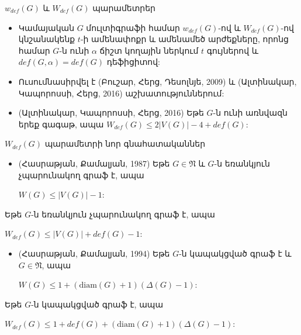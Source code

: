 \begin{frame}{$w_{def}(G)$ և $W_{def}(G)$ պարամետրեր}

\begin{itemize}
    \item Կամայական $G$ մուլտիգրաֆի համար $w_{def}(G)$-ով և $W_{def}(G)$-ով կնշանակենք $t$-ի ամենափոքր և ամենամեծ արժեքները, որոնց համար $G$-ն ունի $\alpha$ ճիշտ կողային ներկում $t$ գույներով և  $def(G,\alpha)=def(G)$ դեֆիցիտով:
    \item Ուսումնասիրվել է (Բուշար, Հերց, Դեսոլնյե, 2009) և (Ալտինակար, Կապորոսսի, Հերց, 2016) աշխատություններում:
    \item (Ալտինակար, Կապորոսսի, Հերց, 2016) Եթե $G$-ն ունի առնվազն երեք գագաթ, ապա $W_{def}(G)\leq 2\vert V(G)\vert -4+def(G)$:
\end{itemize}
\end{frame}


\begin{frame}[shrink]{$W_{def}(G)$ պարամետրի նոր գնահատականներ}
\begin{itemize}
\item (Հասրաթյան, Քամալյան, 1987) Եթե $G \in \mathfrak{N}$ և $G$-ն եռանկյուն չպարունակող գրաֆ է, ապա 
\begin{center}
$W(G)\leq \vert V(G)\vert -1$:
\end{center}
\end{itemize}

\begin{theorem}[3.1.3]
Եթե $G$-ն եռանկյուն չպարունակող գրաֆ է, ապա
\begin{center}
$W_{def}(G)\leq \vert V(G)\vert +def(G)-1$:
\end{center}
\end{theorem}

\begin{itemize}
\item (Հասրաթյան, Քամալյան, 1994) Եթե $G$-ն կապակցված գրաֆ է և $G\in \mathfrak{N}$, ապա
\begin{center}
$W(G)\leq 1 + \left(\mathrm{diam}(G)+1\right)\left(\Delta(G) -1\right)$:
\end{center}
\end{itemize}


\begin{theorem}[3.1.6]
Եթե $G$-ն կապակցված գրաֆ է, ապա
\begin{center}
$W_{def}(G)\leq
1+def(G)+(\mathrm{diam}(G)+1)\left(\Delta(G)-1\right)$:
\end{center}
\end{theorem}
\end{frame}

